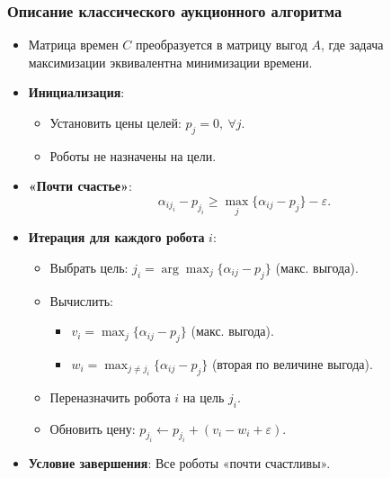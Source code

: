 \documentclass{beamer}
\begin{document}
	
	\begin{frame}
		\frametitle{Описание классического аукционного алгоритма}
			\small	
			\begin{itemize}
				\item Матрица времен \( C \) преобразуется в матрицу выгод \( A \), где задача максимизации эквивалентна минимизации времени.
				\item \textbf{Инициализация}: 
				\begin{itemize}
					\item Установить цены целей: \( p_j = 0, \ \forall j \).
					\item Роботы не назначены на цели.
				\end{itemize}
				\item \textbf{«Почти счастье»}: 
				\[ \alpha_{i j_i} - p_{j_i} \geq \max_j \{\alpha_{ij} - p_j\} - \varepsilon.\]
				\item \textbf{Итерация для каждого робота} \( i \):
				\begin{itemize}
					\item Выбрать цель: \( j_i = \arg\max_j \{\alpha_{ij} - p_j\} \) (макс. выгода).
					\item Вычислить: 
					\begin{itemize}
						\item \( v_i = \max_j \{\alpha_{ij} - p_j\} \) (макс. выгода).
						\item \( w_i = \max_{j \neq j_i} \{\alpha_{ij} - p_j\} \) (вторая по величине выгода).
					\end{itemize}
					\item Переназначить робота \( i \) на цель \( j_i \).
					\item Обновить цену: \( p_{j_i} \gets p_{j_i} + (v_i - w_i + \varepsilon) \).
				\end{itemize}
				\item \textbf{Условие завершения}: Все роботы «почти счастливы».
			\end{itemize}
	\end{frame}
\end{document}
